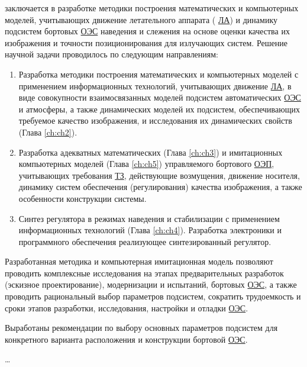 {\novelty} заключается в разработке методики построения математических и компьютерных моделей, учитывающих движение летательного аппарата ( \hyperref[acroLA]{ЛА}) и динамику подсистем бортовых  \hyperref[acroEOS]{ОЭС} наведения и слежения на основе оценки качества их изображения и точности позиционирования для излучающих систем. Решение научной задачи проводилось по следующим направлениям:
\begin{enumerate}
  \item Разработка методики построения математических и компьютерных моделей с применением информационных технологий, учитывающих движение  \hyperref[acroLA]{ЛА}, в виде совокупности взаимосвязанных моделей подсистем автоматических  \hyperref[acroEOS]{ОЭС} и атмосферы, а также динамических моделей их подсистем, обеспечивающих требуемое качество изображения, и исследования их динамических свойств (Глава \ref{ch:ch2}). 
  \item Разработка адекватных математических (Глава \ref{ch:ch3}) и имитационных компьютерных моделей (Глава \ref{ch:ch5}) управляемого бортового  \hyperref[acroEOS]{ОЭП}, учитывающих требования  \hyperref[acroTZ]{ТЗ}, действующие возмущения, движение носителя, динамику систем обеспечения (регулирования) качества изображения, а также особенности конструкции системы. 
  \item Синтез регулятора в режимах наведения и стабилизации с применением информационных технологий (Глава \ref{ch:ch4}). Разработка электроники и программного обеспечения реализующее синтезированный регулятор.
\end{enumerate}

{\influence} 

Разработанная методика и компьютерная имитационная модель позволяют проводить комплексные исследования на этапах предварительных разработок (эскизное проектирование), модернизации и испытаний, бортовых  \hyperref[acroEOS]{ОЭС}, а также проводить рациональный выбор параметров подсистем, сократить трудоемкость и сроки этапов разработки, исследования, настройки и отладки  \hyperref[acroEOS]{ОЭС}.

Выработаны рекомендации по выбору основных параметров подсистем для конкретного варианта расположения и конструкции бортовой  \hyperref[acroEOS]{ОЭС}.

{\methods} \ldots

